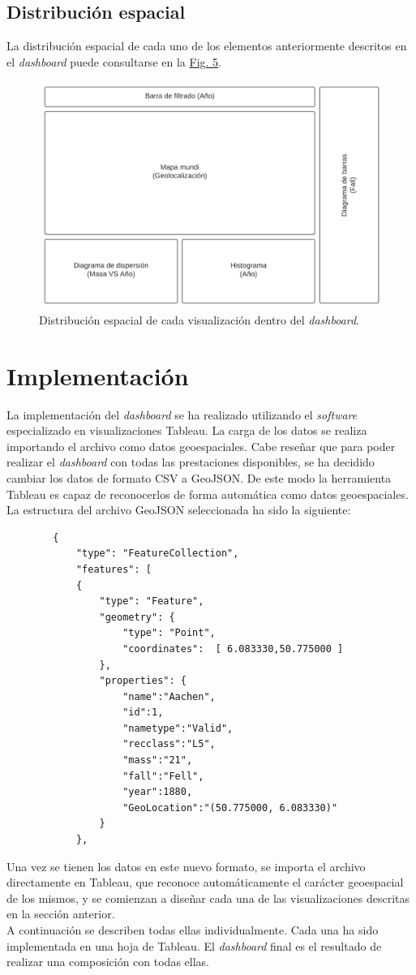\documentclass[12pt]{article}
\begin{document}
	\subsection{Distribución espacial}
	La distribución espacial de cada uno de los elementos anteriormente descritos en el \textit{dashboard} puede consultarse en la \hyperref[Fig:borrador]{Fig. 5}.
	\clearpage
	\begin{landscape}
		\begin{figure}[t]
			\centering
			\label{Fig:borrador}
			\includegraphics[scale=1]{borrador}
			\caption{Distribución espacial de cada visualización dentro del \textit{dashboard}.}
		\end{figure}
	\end{landscape}
	\clearpage
	\section{Implementación}
	La implementación del \textit{dashboard} se ha realizado utilizando el \textit{software} especializado en visualizaciones Tableau. La carga de los datos se realiza importando el archivo como datos geoespaciales. Cabe reseñar que para poder realizar el \textit{dashboard} con todas las prestaciones disponibles, se ha decidido cambiar los datos de formato CSV a GeoJSON. De este modo la herramienta Tableau es capaz de reconocerlos de forma automática como datos geoespaciales. La estructura del archivo GeoJSON seleccionada ha sido la siguiente: 
	\begin{lstlisting}
		{
			"type": "FeatureCollection",
			"features": [
			{
				"type": "Feature",
				"geometry": {
					"type": "Point",
					"coordinates":  [ 6.083330,50.775000 ]
				},
				"properties": {
					"name":"Aachen",
					"id":1,
					"nametype":"Valid",
					"recclass":"L5",
					"mass":"21",
					"fall":"Fell",
					"year":1880,
					"GeoLocation":"(50.775000, 6.083330)"
				}
			},
	\end{lstlisting}
    Una vez se tienen los datos en este nuevo formato, se importa el archivo directamente en Tableau, que reconoce automáticamente el carácter geoespacial de los mismos, y se comienzan a diseñar cada una de las visualizaciones descritas en la sección anterior.\\
    A continuación se describen todas ellas individualmente. Cada una ha sido implementada en una hoja de Tableau. El \textit{dashboard} final es el resultado de realizar una composición con todas ellas.
\end{document}
